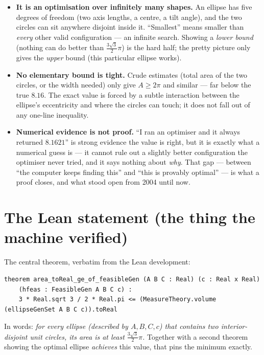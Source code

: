 \documentclass[11pt]{article}
\begin{document}
\begin{itemize}
\item \textbf{It is an optimisation over infinitely many shapes.} An ellipse has five degrees of
freedom (two axis lengths, a centre, a tilt angle), and the two circles can sit anywhere disjoint
inside it. ``Smallest'' means smaller than \emph{every} other valid configuration --- an infinite
search. Showing a \emph{lower bound} (nothing can do better than $\tfrac{3\sqrt3}{2}\pi$) is the hard
half; the pretty picture only gives the \emph{upper} bound (this particular ellipse works).

\item \textbf{No elementary bound is tight.} Crude estimates (total area of the two circles, or the
width needed) only give $A \ge 2\pi$ and similar --- far below the true $8.16$. The exact value is
forced by a subtle interaction between the ellipse's eccentricity and where the circles can touch; it
does not fall out of any one-line inequality.

\item \textbf{Numerical evidence is not proof.} ``I ran an optimiser and it always returned
$8.1621$'' is strong evidence the value is right, but it is exactly what a numerical guess is --- it
cannot rule out a slightly better configuration the optimiser never tried, and it says nothing about
\emph{why}. That gap --- between ``the computer keeps finding this'' and ``this is provably optimal''
--- is what a proof closes, and what stood open from 2004 until now.
\end{itemize}

\section{The Lean statement (the thing the machine verified)}

The central theorem, verbatim from the Lean development:

\begin{lstlisting}[style=lean]
theorem area_toReal_ge_of_feasibleGen (A B C : Real) (c : Real x Real)
    (hfeas : FeasibleGen A B C c) :
    3 * Real.sqrt 3 / 2 * Real.pi <= (MeasureTheory.volume (ellipseGenSet A B C c)).toReal
\end{lstlisting}

\noindent In words: \emph{for every ellipse (described by $A,B,C,c$) that contains two
interior-disjoint unit circles, its area is at least $\tfrac{3\sqrt3}{2}\pi$.} Together with a second
theorem showing the optimal ellipse \emph{achieves} this value, that pins the minimum exactly.
\end{document}
